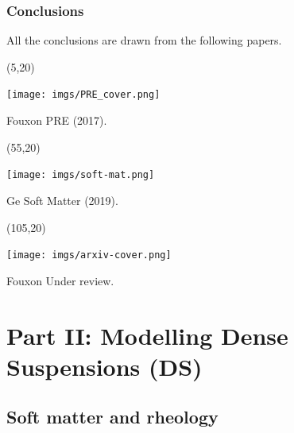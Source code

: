 \begin{frame}[noframenumbering,t]
  \frametitle{Conclusions}

  All the conclusions are drawn from the following papers.
  
  \begin{textblock}{45}(5,20)
    \begin{tcolorbox}[beamer,
        width=\textwidth,
        arc=0pt,
        boxsep=1pt,
        left=0pt,right=0pt,top=0pt,bottom=0pt,
      ]
      \texttt{[image: imgs/PRE\_cover.png]}
    \end{tcolorbox}
    Fouxon \etal PRE (2017).
  \end{textblock}

  \begin{textblock}{45}(55,20)
    \begin{tcolorbox}[beamer,
        width=\textwidth,
        arc=0pt,
        boxsep=1pt,
        left=0pt,right=0pt,top=0pt,bottom=0pt,
      ]
      \texttt{[image: imgs/soft-mat.png]}
    \end{tcolorbox}
    Ge \etal Soft Matter (2019).
  \end{textblock}

  \begin{textblock}{45}(105,20)
    \begin{tcolorbox}[beamer,
        width=\textwidth,
        arc=0pt,
        boxsep=1pt,
        left=0pt,right=0pt,top=0pt,bottom=0pt,
      ]
      \texttt{[image: imgs/arxiv-cover.png]}
    \end{tcolorbox}
    Fouxon \etal Under review.
  \end{textblock}

\end{frame}

\hypertarget{part2}{%
  \section{Part II: Modelling Dense Suspensions (DS)}}

\hypertarget{background2}{%
  \subsection{Soft matter and rheology}}

